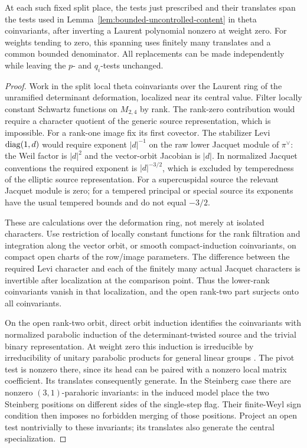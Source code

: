 \begin{lemma}\label{lem:fixed-place-spanning}
 At each such fixed split place, the tests just prescribed and their
 translates span the tests used in
 Lemma~\ref{lem:bounded-uncontrolled-content} in theta coinvariants,
 after inverting a Laurent polynomial nonzero at weight zero.  For
 weights tending to zero, this spanning uses finitely many translates
 and a common bounded denominator.  All replacements can be made
 independently while leaving the $p$- and $q_i$-tests unchanged.
\end{lemma}
\begin{proof}
 Work in the split local theta coinvariants over the Laurent ring of
 the unramified determinant deformation, localized near its central
 value.  Filter locally constant Schwartz functions on $M_{2,4}$ by
 rank.  The rank-zero contribution would require a character quotient
 of the generic source representation, which is impossible.
 For a rank-one image fix its first covector.  The stabilizer Levi
 $\operatorname{diag}(1,d)$ would require exponent $|d|^{-1}$ on the raw lower
 Jacquet module of $\pi^\vee$: the Weil factor is $|d|^2$ and the
 vector-orbit Jacobian is $|d|$.  In normalized Jacquet conventions
 the required exponent is $|d|^{-3/2}$, which is excluded by
 temperedness of the elliptic source representation.  For a
 supercuspidal source the relevant Jacquet module is zero; for a
 tempered principal or special source its exponents have the usual
 tempered bounds and do not equal $-3/2$.

 These are calculations over the deformation ring, not merely at
 isolated characters.  Use restriction of locally constant functions
 for the rank filtration and integration along the vector orbit, or
 smooth compact-induction coinvariants, on compact open charts of
 the row/image parameters.  The difference between the required Levi
 character and each of the finitely many actual Jacquet characters
 is invertible after localization at the comparison point.  Thus
 the lower-rank coinvariants vanish in that localization, and the
 open rank-two part surjects onto all coinvariants.

 On the open rank-two orbit, direct orbit induction identifies the
 coinvariants with normalized parabolic induction of the
 determinant-twisted source and the trivial binary representation.
 At weight zero this induction is irreducible by irreducibility of
 unitary parabolic products for general linear groups
 \cite{Tadic1986}.  The pivot test is nonzero there, since its head
 can be paired with a nonzero local matrix coefficient.  Its
 translates consequently generate.  In the Steinberg case there are
 nonzero $(3,1)$-parahoric invariants: in the induced model place the
 two Steinberg positions on different sides of the single-step flag.
 Their finite-Weyl sign condition then imposes no forbidden merging
 of those positions.  Project an open test nontrivially to these
 invariants; its translates also generate the central
 specialization.


\end{proof}
